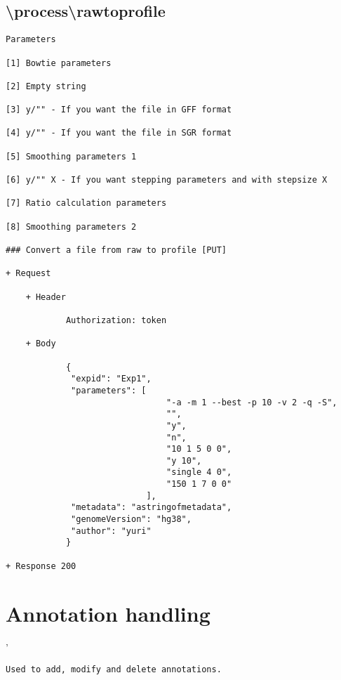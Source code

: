 \subsection*{\textbackslash process\textbackslash rawtoprofile}
\begin{verbatim}
Parameters

[1] Bowtie parameters

[2] Empty string

[3] y/"" - If you want the file in GFF format

[4] y/"" - If you want the file in SGR format

[5] Smoothing parameters 1

[6] y/"" X - If you want stepping parameters and with stepsize X

[7] Ratio calculation parameters

[8] Smoothing parameters 2

### Convert a file from raw to profile [PUT]

+ Request 

    + Header
    
            Authorization: token
            
    + Body
            
            {
             "expid": "Exp1",
             "parameters": [
                                "-a -m 1 --best -p 10 -v 2 -q -S", 
                                "",
                                "y",
                                "n",
                                "10 1 5 0 0",
                                "y 10",
                                "single 4 0",
                                "150 1 7 0 0"
                            ],
             "metadata": "astringofmetadata",
             "genomeVersion": "hg38",
             "author": "yuri"
            }
            
+ Response 200
\end{verbatim}

\section*{Annotation handling}'
\begin{verbatim}
Used to add, modify and delete annotations.
\end{verbatim}
